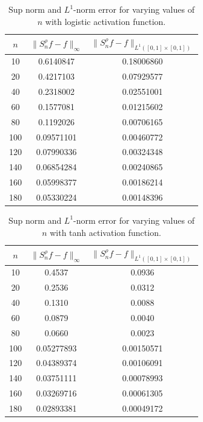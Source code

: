 \documentclass[12pt, reqno]{amsart}
\numberwithin{equation}{section}
\theoremstyle{definition}
\theoremstyle{remark}
\numberwithin{equation}{section}
\begin{document}
\begin{table}[H]
\centering
\begin{tabular}{|c|c|c|}
\hline
\textbf{$n$} & \textbf{$\|S^\rho_nf-f\|_\infty$} & \textbf{$\|S_n^\rho f-f\|_{L^1([0,1]\times[0,1])}$} \\
\hline
10 & 0.6140847 & 0.18006860 \\
\hline
20 & 0.4217103 & 0.07929577 \\
\hline
40 & 0.2318002 & 0.02551001 \\
\hline
60 & 0.1577081 & 0.01215602 \\
\hline
80 & 0.1192026 & 0.00706165 \\
\hline
100 & 0.09571101 & 0.00460772 \\
\hline
120 & 0.07990336 & 0.00324348 \\
\hline
140 & 0.06854284 & 0.00240865 \\
\hline
160 & 0.05998377 & 0.00186214 \\
\hline
180 & 0.05330224 & 0.00148396 \\
\hline
\end{tabular}
\caption{Sup norm and $L^1$-norm error for varying values of $n$ with logistic activation function.}
\label{tablogis}
\end{table}


\begin{table}[H]
\centering
\begin{tabular}{|c| c| c|}
\hline
 \textbf{$n$} & \textbf{$\|S^\rho_nf-f\|_\infty$} & \textbf{$\|S^\rho_nf-f\|_{L^1([0,1]\times[0,1])}$} \\
\hline
10 & 0.4537 & 0.0936 \\
\hline
20 & 0.2536 & 0.0312 \\
\hline
40 & 0.1310 & 0.0088 \\
\hline
60 & 0.0879 & 0.0040 \\
\hline
80 & 0.0660 & 0.0023 \\
\hline
100 & 0.05277893 & 0.00150571 \\
\hline
120 & 0.04389374 & 0.00106091 \\
\hline
140 & 0.03751111 & 0.00078993 \\
\hline
160 & 0.03269716 & 0.00061305 \\
\hline
180 & 0.02893381 & 0.00049172 \\
\hline
\end{tabular}
\caption{Sup norm and $L^1$-norm error for varying values of $n$ with tanh activation function.}
\label{tabtanh}
\end{table}
\end{document}
